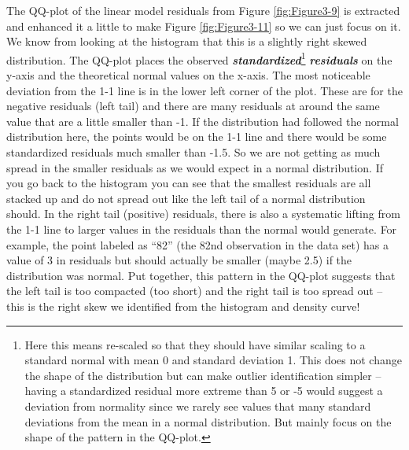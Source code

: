 \documentclass[]{book}
\let\rmarkdownfootnote\footnote%
\def\footnote{\protect\rmarkdownfootnote}
\theoremstyle{definition}
\theoremstyle{definition}
\theoremstyle{remark}
\begin{document}
The QQ-plot of the linear model residuals from Figure
\ref{fig:Figure3-9} is extracted and enhanced it a little to make Figure
\ref{fig:Figure3-11} so we can just focus on it. We know from looking at
the histogram that this is a slightly right skewed distribution. The
QQ-plot places the observed \textbf{\emph{standardized}}\footnote{Here
  this means re-scaled so that they should have similar scaling to a
  standard normal with mean 0 and standard deviation 1. This does not
  change the shape of the distribution but can make outlier
  identification simpler -- having a standardized residual more extreme
  than 5 or -5 would suggest a deviation from normality since we rarely
  see values that many standard deviations from the mean in a normal
  distribution. But mainly focus on the shape of the pattern in the
  QQ-plot.} \textbf{\emph{residuals}} on the y-axis and the theoretical
normal values on the x-axis. The most noticeable deviation from the 1-1
line is in the lower left corner of the plot. These are for the negative
residuals (left tail) and there are many residuals at around the same
value that are a little smaller than -1. If the distribution had
followed the normal distribution here, the points would be on the 1-1
line and there would be some standardized residuals much smaller than
-1.5. So we are not getting as much spread in the smaller residuals as
we would expect in a normal distribution. If you go back to the
histogram you can see that the smallest residuals are all stacked up and
do not spread out like the left tail of a normal distribution should. In
the right tail (positive) residuals, there is also a systematic lifting
from the 1-1 line to larger values in the residuals than the normal
would generate. For example, the point labeled as ``82'' (the 82nd
observation in the data set) has a value of 3 in residuals but should
actually be smaller (maybe 2.5) if the distribution was normal. Put
together, this pattern in the QQ-plot suggests that the left tail is too
compacted (too short) and the right tail is too spread out -- this is
the right skew we identified from the histogram and density curve!
\end{document}
